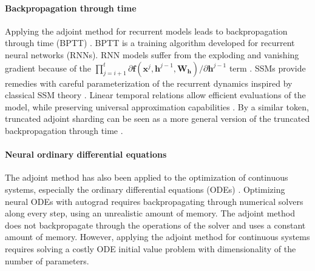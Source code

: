 \documentclass{article}
\begin{document}
\paragraph{Backpropagation through time}
Applying the adjoint method for recurrent models leads to backpropagation through time (BPTT) \citep{bptt}. BPTT is a training algorithm developed for recurrent neural networks (RNNs). RNN models suffer from the exploding and vanishing gradient because of the $\prod_{j=i+1}^t\partial \mathbf{f}(\mathbf{x}^j, \mathbf{h}^{j-1},\mathbf{W}_{\mathbf{h}})/\partial \mathbf{h}^{j-1}$ term \citep{pascanu2013difficultytrainingrecurrentneural}. SSMs provide remedies with careful parameterization of the recurrent dynamics inspired by classical SSM theory \citep{fu2023hungryhungryhipposlanguage, gu2021combiningrecurrentconvolutionalcontinuoustime, gu2022trainhippostatespace, gupta2023simplifyingunderstandingstatespace, orvieto2023resurrectingrecurrentneuralnetworks, NEURIPS2020_c3581d21}. Linear temporal relations allow efficient evaluations of the model, while preserving universal approximation capabilities \citep{wang2023statespacemodelslayerwisenonlinearity}. By a similar token, truncated adjoint sharding can be seen as a more general version of the truncated backpropagation through time \citep{Jaeger2005ATO, tallec2017unbiasingtruncatedbackpropagationtime}. 


\paragraph{Neural ordinary differential equations}
The adjoint method has also been applied to the optimization of continuous systems, especially the ordinary differential equations (ODEs) \citep{chen2019neuralordinarydifferentialequations, dupont2019augmentedneuralodes}. Optimizing neural ODEs with autograd requires backpropagating through numerical solvers along every step, using an unrealistic amount of memory. The adjoint method does not backpropagate through the operations of the solver and uses a constant amount of memory. However, applying the adjoint method for continuous systems requires solving a costly ODE initial value problem with dimensionality of the number of parameters.
\end{document}

